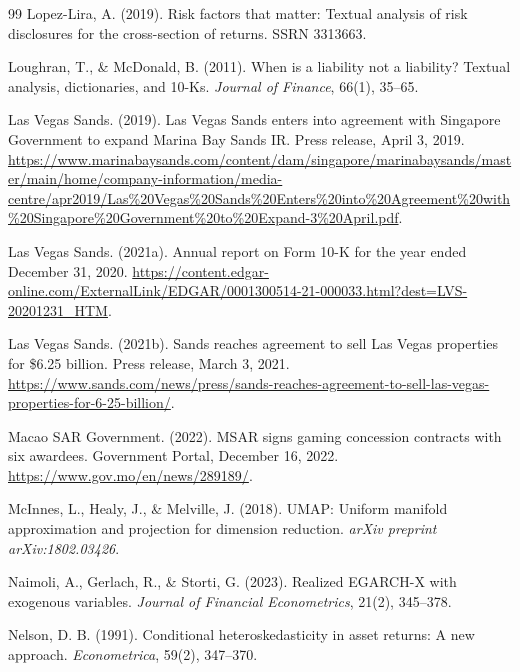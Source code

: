 \documentclass[11pt, a4paper]{article}
\begin{document}
\begin{thebibliography}{99}
     Lopez-Lira, A. (2019). Risk factors that matter: Textual analysis of risk disclosures for the cross-section of returns. SSRN 3313663.

     Loughran, T., \& McDonald, B. (2011). When is a liability not a liability? Textual analysis, dictionaries, and 10-Ks. \textit{Journal of Finance}, 66(1), 35--65.

     Las Vegas Sands. (2019). Las Vegas Sands enters into agreement with Singapore Government to expand Marina Bay Sands IR. Press release, April 3, 2019. \url{https://www.marinabaysands.com/content/dam/singapore/marinabaysands/master/main/home/company-information/media-centre/apr2019/Las%20Vegas%20Sands%20Enters%20into%20Agreement%20with%20Singapore%20Government%20to%20Expand-3%20April.pdf}.

     Las Vegas Sands. (2021a). Annual report on Form 10-K for the year ended December 31, 2020. \url{https://content.edgar-online.com/ExternalLink/EDGAR/0001300514-21-000033.html?dest=LVS-20201231_HTM}.

     Las Vegas Sands. (2021b). Sands reaches agreement to sell Las Vegas properties for \$6.25 billion. Press release, March 3, 2021. \url{https://www.sands.com/news/press/sands-reaches-agreement-to-sell-las-vegas-properties-for-6-25-billion/}.

     Macao SAR Government. (2022). MSAR signs gaming concession contracts with six awardees. Government Portal, December 16, 2022. \url{https://www.gov.mo/en/news/289189/}.

     McInnes, L., Healy, J., \& Melville, J. (2018). UMAP: Uniform manifold approximation and projection for dimension reduction. \textit{arXiv preprint arXiv:1802.03426}.

     Naimoli, A., Gerlach, R., \& Storti, G. (2023). Realized EGARCH-X with exogenous variables. \textit{Journal of Financial Econometrics}, 21(2), 345--378.

     Nelson, D. B. (1991). Conditional heteroskedasticity in asset returns: A new approach. \textit{Econometrica}, 59(2), 347--370.


\end{thebibliography}
\end{document}
